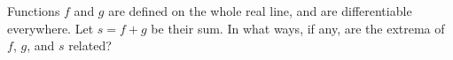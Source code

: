 Functions $f$ and $g$ are defined on the whole real line, and are differentiable everywhere.
Let $s=f+g$ be their sum. In what ways, if any, are the extrema of $f$, $g$, and $s$ related?
